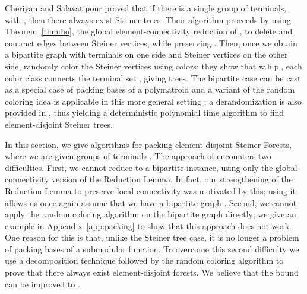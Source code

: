 \documentclass[11pt]{article}
\begin{document}
Cheriyan and Salavatipour \cite{cs} proved that if there is a single
group  of terminals, with , then there always exist
 Steiner trees. Their algorithm proceeds by
using Theorem~\ref{thm:ho}, the global element-connectivity reduction
of \cite{hind}, to delete and contract edges between Steiner vertices,
while preserving . Then, once we obtain a bipartite
graph  with terminals on one side and Steiner vertices on the
other side, randomly color the Steiner vertices using 
colors; they show that w.h.p., each color class connects the terminal
set , giving  trees. The bipartite case can be cast
as a special case of packing bases of a polymatroid and a variant of
the random coloring idea is applicable in this more general setting
\cite{CalinescuCV07}; a derandomization is also provided in
\cite{CalinescuCV07}, thus yielding a deterministic polynomial time
algorithm to find  element-disjoint Steiner trees.

\iffalse
 (a
polymatroid is an integer-valued monotone submodular set function 
with ).  For the Steiner Tree packing problem, in
the bipartite graph , for any  of
Steiner vertices, let  be the number of components that contain
terminals in , the graph induced by . We
define ; a set of Steiner vertices  is a base
if . It is easy to see that  is a
polymatroid, and the problem of packing bases of  is equivalent to
packing element-disjoint Steiner Trees. Therefore, since
\cite{CalinescuCV07} describes a derandomization of the
random-coloring algorithm, we have a deterministic algorithm to pack
element-disjoint Steiner Trees.
\fi

In this section, we give algorithms for packing element-disjoint
Steiner Forests, where we are given  groups of terminals . The approach of \cite{cs} encounters two difficulties.
First, we cannot reduce to a bipartite instance, using only the
global-connectivity version of the Reduction Lemma. In fact, our
strengthening of the Reduction Lemma to preserve local connectivity
was motivated by this; using it allows us once again assume that we
have a bipartite graph .  Second, we cannot apply the
random coloring algorithm on the bipartite graph  directly; we
give an example in Appendix~\ref{app:packing} to show that this
approach does not work. One reason for this is that, unlike the
Steiner tree case, it is no longer a problem of packing bases of a
submodular function.  To overcome this second difficulty we use a
decomposition technique followed by the random coloring algorithm to
prove that there always exist 
element-disjoint forests.  We believe that the bound can be improved
to .
\end{document}
